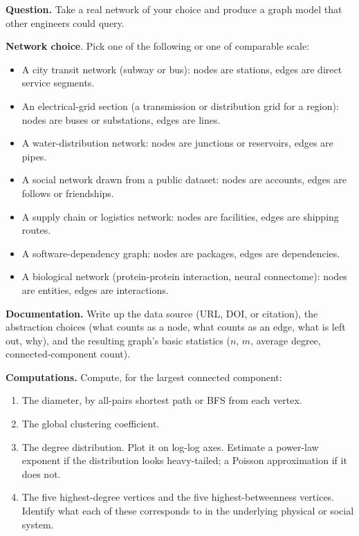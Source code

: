 \begin{project}
\textbf{Question.} Take a real network of your choice and produce a
graph model that other engineers could query.

\textbf{Network choice}. Pick one of the following or one of
comparable scale:
\begin{itemize}[leftmargin=*]
  \item A city transit network (subway or bus): nodes are stations,
    edges are direct service segments.
  \item An electrical-grid section (a transmission or distribution
    grid for a region): nodes are buses or substations, edges are
    lines.
  \item A water-distribution network: nodes are junctions or
    reservoirs, edges are pipes.
  \item A social network drawn from a public dataset: nodes are
    accounts, edges are follows or friendships.
  \item A supply chain or logistics network: nodes are facilities,
    edges are shipping routes.
  \item A software-dependency graph: nodes are packages, edges are
    dependencies.
  \item A biological network (protein-protein interaction, neural
    connectome): nodes are entities, edges are interactions.
\end{itemize}

\textbf{Documentation.} Write up the data source (URL, DOI, or
citation), the abstraction choices (what counts as a node, what
counts as an edge, what is left out, why), and the resulting graph's
basic statistics ($n$, $m$, average degree, connected-component
count).

\textbf{Computations.} Compute, for the largest connected component:
\begin{enumerate}[leftmargin=*]
  \item The diameter, by all-pairs shortest path or BFS from each
    vertex.
  \item The global clustering coefficient.
  \item The degree distribution. Plot it on log-log axes. Estimate
    a power-law exponent if the distribution looks heavy-tailed; a
    Poisson approximation if it does not.
  \item The five highest-degree vertices and the five
    highest-betweenness vertices. Identify what each of these
    corresponds to in the underlying physical or social system.
\end{enumerate}


\end{project}
